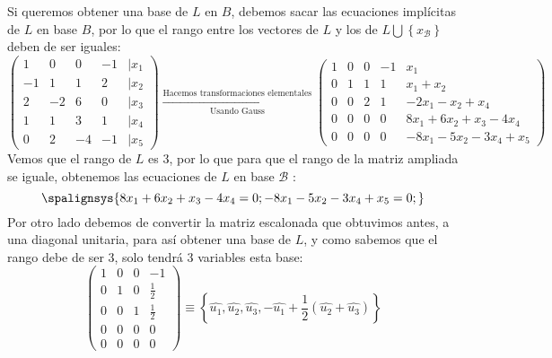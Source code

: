 Si queremos obtener una base de \(L\) en \(B\), debemos sacar las ecuaciones implícitas de \(L\) en base \(B\), por lo que el rango entre los vectores de \(L\) y los de \(L \bigcup \left\{x_\mathcal{B}\right\} \) deben de ser iguales:
\[
        \begin{pmatrix}
                1  & 0  & 0  & -1 & | x_1 \\
                -1 & 1  & 1  & 2  & |x_2  \\
                2  & -2 & 6  & 0  & |x_3  \\
                1  & 1  & 3  & 1  & |x_4  \\
                0  & 2  & -4 & -1 & |x_5
        \end{pmatrix}
        \xrightarrow[\text{Usando Gauss}]{\text{Hacemos transformaciones elementales}}
        \begin{pmatrix}
                1 & 0 & 0 & -1 & x_1                      \\
                0 & 1 & 1 & 1  & x_1 + x_2                \\
                0 & 0 & 2 & 1  & -2x_1 - x_2 +x_4         \\
                0 & 0 & 0 & 0  & 8x_1 + 6x_2 + x_3 - 4x_4 \\
                0 & 0 & 0 & 0  & -8x_1 -5x_2 - 3x_4 + x_5
        \end{pmatrix}
\]
Vemos que el rango de \(L\) es 3, por lo que para que el rango de la matriz ampliada se iguale, obtenemos las ecuaciones de \(L\) en base \(\mathcal{B}\) :
\[
        \spalignsys{
                8x_1 + 6x_2 + x_3 - 4x_4 = 0;
                -8x_1 -5x_2 - 3x_4 + x_5 = 0;
        }
\]
Por otro lado debemos de convertir la matriz escalonada que obtuvimos antes, a una diagonal unitaria, para así obtener una base de \(L\), y como sabemos que el rango debe de ser 3, solo tendrá 3 variables esta base:
\[
        \begin{pmatrix}
                1 & 0 & 0 & -1          \\
                0 & 1 & 0 & \frac{1}{2} \\
                0 & 0 & 1 & \frac{1}{2} \\
                0 & 0 & 0 & 0           \\
                0 & 0 & 0 & 0
        \end{pmatrix} \equiv \left \{ \hat{u_1}, \hat{u_2}, \hat{u_3}, -\hat{u_1} + \frac{1}{2}(\hat{u_2} + \hat{u_3}) \right \}
\]
